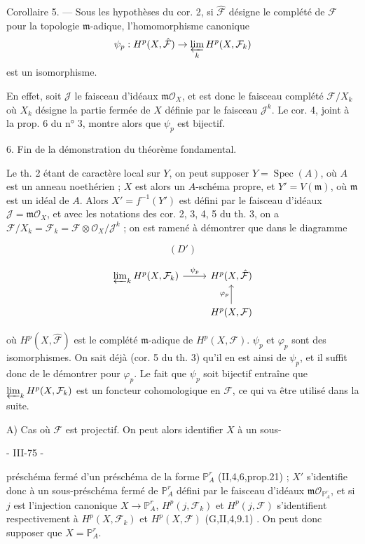 Corollaire 5. — Sous les hypothèses du cor. 2, si $\hat{\mathcal{F}}$ désigne le complété de $\mathcal{F}$ pour la topologie $\mathfrak{m}$-adique, l'homomorphisme canonique
$$\psi_p : H^p(X, \hat{\mathcal{F}}) \to \varprojlim_k H^p(X, \mathcal{F}_k)$$
est un isomorphisme.

En effet, soit $\mathcal{J}$ le faisceau d'idéaux $\mathfrak{m}\mathcal{O}_X$, et est donc le faisceau complété $\mathcal{F}/X_k$ où $X_k$ désigne la partie fermée de $X$ définie par le faisceau $\mathcal{J}^k$. Le cor. 4, joint à la prop. 6 du n° 3, montre alors que $\psi_p$ est bijectif.

6. Fin de la démonstration du théorème fondamental.

Le th. 2 étant de caractère local sur $Y$, on peut supposer $Y = \operatorname{Spec}(A)$, où $A$ est un anneau noethérien ; $X$ est alors un $A$-schéma propre, et $Y' = V(\mathfrak{m})$, où $\mathfrak{m}$ est un idéal de $A$. Alors $X' = f^{-1}(Y')$ est défini par le faisceau d'idéaux $\mathcal{J} = \mathfrak{m}\mathcal{O}_X$, et avec les notations des cor. 2, 3, 4, 5 du th. 3, on a $\mathcal{F}/X_k = \mathcal{F}_k = \mathcal{F} \otimes \mathcal{O}_X / \mathcal{J}^k$ ; on est ramené à démontrer que dans le diagramme

$$(D')$$

$$\begin{tikzcd}
\varprojlim_k H^p(X, \mathcal{F}_k) \arrow[r, "\psi_p"] & H^p(X, \hat{\mathcal{F}}) \\
& H^p(X, \mathcal{F}) \arrow[u, "\varphi_p"]
\end{tikzcd}$$

où $H^p(X, \hat{\mathcal{F}})$ est le complété $\mathfrak{m}$-adique de $H^p(X, \mathcal{F})$. $\psi_p$ et $\varphi_p$ sont des isomorphismes. On sait déjà (cor. 5 du th. 3) qu'il en est ainsi de $\psi_p$, et il suffit donc de le démontrer pour $\varphi_p$. Le fait que $\psi_p$ soit bijectif entraîne que $\varprojlim_k H^p(X, \mathcal{F}_k)$ est un foncteur cohomologique en $\mathcal{F}$, ce qui va être utilisé dans la suite.

A) Cas où $\mathcal{F}$ est projectif. On peut alors identifier $X$ à un sous-

\newpage


- III-75 -

préschéma fermé d'un préschéma de la forme $\mathbb{P}^r_A$ (II,4,6,prop.21) ; $X'$ s'identifie donc à un sous-préschéma fermé de $\mathbb{P}^r_A$ défini par le faisceau d'idéaux $\mathfrak{m}\mathcal{O}_{\mathbb{P}^r_A}$, et si $j$ est l'injection canonique $X \to \mathbb{P}^r_A$, $H^p(j, \mathcal{F}_k)$ et $H^p(j, \mathcal{F})$ s'identifient respectivement à $H^p(X, \mathcal{F}_k)$ et $H^p(X, \mathcal{F})$ (G,II,4,9.1) . On peut donc supposer que $X = \mathbb{P}^r_A$.

